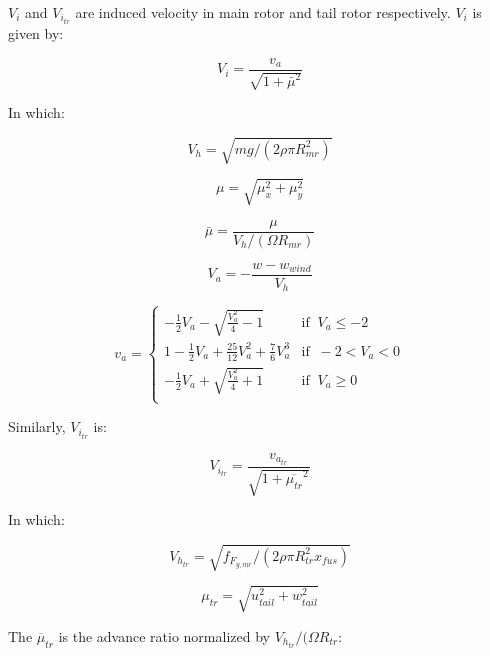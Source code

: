 $V_i$ and $V_{i_{tr}}$ are induced velocity in main rotor and tail rotor respectively. $V_i$ is given by:

\begin{equation}
	V_i=\frac{v_a}{\sqrt{1+\bar{\mu}^2}}
\end{equation}

In which:

\begin{equation}
	V_h=\sqrt{mg/(2\rho \pi R_{mr}^2)}
\end{equation}

\begin{equation}
	\mu=\sqrt{\mu_x^2+\mu_y^2} 
\end{equation}

\begin{equation}
	\bar{\mu}=\frac{\mu}{V_h/(\Omega R_{mr})} 
\end{equation}

\begin{equation}
	V_a=-\frac{w-w_{wind}}{V_h}
\end{equation}

\begin{equation}
	v_a = \left\{
	\begin{array}{ll}
		-\frac{1}{2} V_a-\sqrt{\frac{V_a^2}{4}-1} & \mbox{if } \ V_a 	\leqslant -2 \\
		1-\frac{1}{2} V_a+\frac{25}{12} V_a^2 +\frac{7}{6} V_a^3 & \mbox{if } \ -2<V_a<0 \\
		-\frac{1}{2} V_a+\sqrt{\frac{V_a^2}{4}+1} & \mbox{if } \ V_a	\geqslant 0 \\
	\end{array}
	\right.
	\label{vamr}
\end{equation}

Similarly, $V_{i_{tr}}$ is:

\begin{equation}
	V_{i_{tr}}=\frac{v_{a_{tr}}}{\sqrt{1+\overline{\mu_{tr}}^2}}
\end{equation}

In which:

\begin{equation}
	V_{h_{tr}}=\sqrt{f_{F_{y,mr}}/(2\rho \pi R_{tr}^2 x_{fus} )}
\end{equation}

\begin{equation}
	\mu_{tr}=\sqrt{u_{tail}^2+w_{tail}^2} 
\end{equation}

The $\overline{\mu}_{tr}$ is the advance ratio normalized by $V_{h_{tr}}/(\Omega R_{tr}$:

